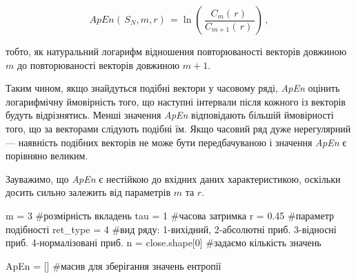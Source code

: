 \documentclass[
  letterpaper,
]{report}
\newenvironment{Shaded}{\begin{snugshade}}{\end{snugshade}}
\newcommand{\CommentTok}[1]{\textcolor[rgb]{0.37,0.37,0.37}{#1}}
\newcommand{\DecValTok}[1]{\textcolor[rgb]{0.68,0.00,0.00}{#1}}
\newcommand{\FloatTok}[1]{\textcolor[rgb]{0.68,0.00,0.00}{#1}}
\newcommand{\NormalTok}[1]{\textcolor[rgb]{0.00,0.23,0.31}{#1}}
\newcommand{\OperatorTok}[1]{\textcolor[rgb]{0.37,0.37,0.37}{#1}}
\begin{document}
\[ 
ApEn(\,S_{N}, m, r)\, = \ln(\,\frac{C_{m}(\,r)\,}{C_{m+1}(\,r)\,})\,, 
\]

тобто, як натуральний логарифм відношення повторюваності векторів
довжиною \(m\) до повторюваності векторів довжиною \(m+1\).

Таким чином, якщо знайдуться подібні вектори у часовому ряді,
\emph{ApEn} оцінить логарифмічну ймовірність того, що наступні інтервали
після кожного із векторів будуть відрізнятись. Менші значення
\emph{ApEn} відповідають більшій ймовірності того, що за векторами
слідують подібні їм. Якщо часовий ряд дуже нерегулярний --- наявність
подібних векторів не може бути передбачуваною і значення \emph{ApEn} є
порівняно великим.

Зауважимо, що \emph{ApEn} є нестійкою до вхідних даних характеристикою,
оскільки досить сильно залежить від параметрів \(m\) та \(r\).

\begin{Shaded}
\begin{Highlighting}[]
\NormalTok{m }\OperatorTok{=} \DecValTok{3} \CommentTok{\#розмірність вкладень}
\NormalTok{tau }\OperatorTok{=} \DecValTok{1} \CommentTok{\#часова затримка}
\NormalTok{r }\OperatorTok{=} \FloatTok{0.45} \CommentTok{\#параметр подібності}
\NormalTok{ret\_type }\OperatorTok{=} \DecValTok{4} \CommentTok{\#вид ряду: 1{-}вихідний, 2{-}абсолютні приб. 3{-}відносні приб. 4{-}нормалізовані приб. }
\NormalTok{n }\OperatorTok{=}\NormalTok{ close.shape[}\DecValTok{0}\NormalTok{] }\CommentTok{\#задаємо кількість значень}

\NormalTok{ApEn }\OperatorTok{=}\NormalTok{ [] }\CommentTok{\#масив для зберігання значень ентропії}
\end{Highlighting}
\end{Shaded}
\end{document}
